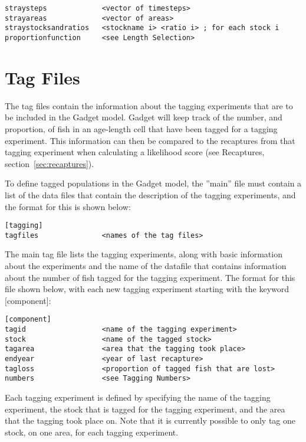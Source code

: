 \documentclass[10pt,twoside]{book}
\begin{document}
{\small\begin{verbatim}
straysteps             <vector of timesteps>
strayareas             <vector of areas>
straystocksandratios   <stockname i> <ratio i> ; for each stock i
proportionfunction     <see Length Selection>
\end{verbatim}}

\chapter{Tag Files}\label{chap:tag}
The tag files contain the information about the tagging experiments that are to be included in the Gadget model.  Gadget will keep track of the number, and proportion, of fish in an age-length cell that have been tagged for a tagging experiment.  This information can then be compared to the recaptures from that tagging experiment when calculating a likelihood score (see Recaptures, section~\ref{sec:recaptures}).

\bigskip
To define tagged populations in the Gadget model, the ''main'' file must contain a list of the data files that contain the description of the tagging experiments, and the format for this is shown below:

{\small\begin{verbatim}
[tagging]
tagfiles               <names of the tag files>
\end{verbatim}}

The main tag file lists the tagging experiments, along with basic information about the experiments and the name of the datafile that contains information about the number of fish tagged for the tagging experiment.  The format for this file shown below, with each new tagging experiment starting with the keyword [component]:

{\small\begin{verbatim}
[component]
tagid                  <name of the tagging experiment>
stock                  <name of the tagged stock>
tagarea                <area that the tagging took place>
endyear                <year of last recapture>
tagloss                <proportion of tagged fish that are lost>
numbers                <see Tagging Numbers>
\end{verbatim}}

Each tagging experiment is defined by specifying the name of the tagging experiment, the stock that is tagged for the tagging experiment, and the area that the tagging took place on.  Note that it is currently possible to only tag one stock, on one area, for each tagging experiment.
\end{document}
